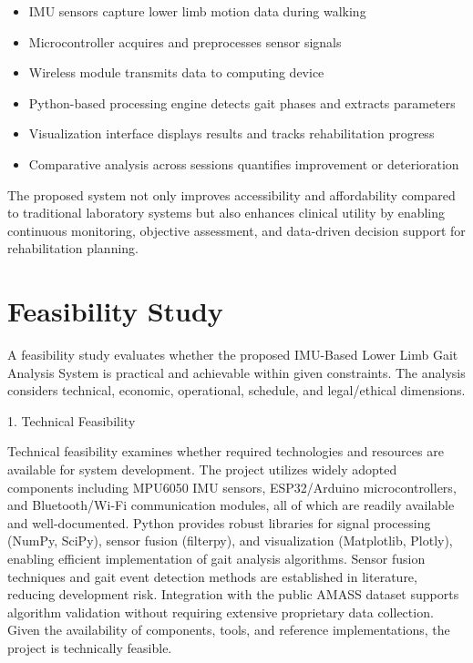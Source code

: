 \documentclass[12pt,a4paper]{report}
\begin{document}
\begin{itemize}
\item IMU sensors capture lower limb motion data during walking

\item Microcontroller acquires and preprocesses sensor signals

\item Wireless module transmits data to computing device

\item Python-based processing engine detects gait phases and extracts parameters

\item Visualization interface displays results and tracks rehabilitation progress

\item Comparative analysis across sessions quantifies improvement or deterioration
\end{itemize}
The proposed system not only improves accessibility and affordability compared to traditional laboratory systems but also enhances clinical utility by enabling continuous monitoring, objective assessment, and data-driven decision support for rehabilitation planning.

\section{Feasibility Study}
A feasibility study evaluates whether the proposed IMU-Based Lower Limb Gait Analysis System is practical and achievable within given constraints. The analysis considers technical, economic, operational, schedule, and legal/ethical dimensions.

1. Technical Feasibility

Technical feasibility examines whether required technologies and resources are available for system development. The project utilizes widely adopted components including MPU6050 IMU sensors, ESP32/Arduino microcontrollers, and Bluetooth/Wi-Fi communication modules, all of which are readily available and well-documented. Python provides robust libraries for signal processing (NumPy, SciPy), sensor fusion (filterpy), and visualization (Matplotlib, Plotly), enabling efficient implementation of gait analysis algorithms. Sensor fusion techniques and gait event detection methods are established in literature, reducing development risk. Integration with the public AMASS dataset supports algorithm validation without requiring extensive proprietary data collection. Given the availability of components, tools, and reference implementations, the project is technically feasible.
\end{document}
